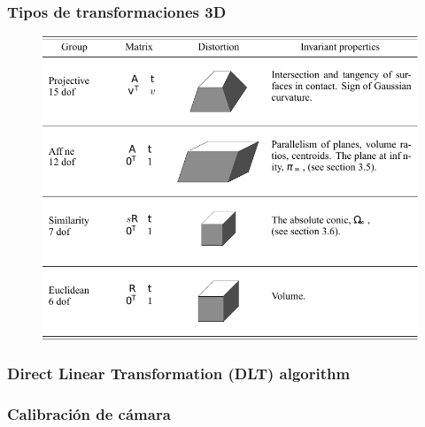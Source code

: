 \begin{frame}
	\frametitle{Tipos de transformaciones 3D}
	\footnotesize
	
	\begin{figure}
		\includegraphics[width=0.6\columnwidth]{./images/transformation_table_3d.pdf}
	\end{figure}
	
\end{frame}


\begin{frame}
    \frametitle{Direct Linear Transformation (DLT) algorithm}
    \footnotesize
    
\end{frame}



\begin{frame}
	\frametitle{Calibración de cámara}
	\footnotesize
	
	
\end{frame}



